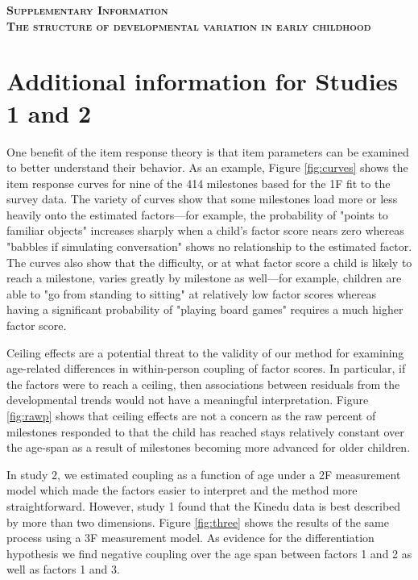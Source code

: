 \documentclass[11pt]{article}
\begin{document}
\begin{center}
\textbf{\textsc{\LARGE Supplementary Information}}\\
\textbf{\textsc{\LARGE The structure of developmental variation in early childhood}}
\end{center}

\section{Additional information for Studies 1 and  2}

One benefit of the item response theory is that item parameters can be examined to better understand their behavior. As an example, Figure \ref{fig:curves} shows the item response curves for nine of the 414 milestones based for the 1F fit to the survey data. The variety of curves show that some milestones load more or less heavily onto the estimated factors—for example, the probability of "points to familiar objects" increases sharply when a child's factor score nears zero whereas "babbles if simulating conversation" shows no relationship to the estimated factor. The curves also show that the difficulty, or at what factor score a child is likely to reach a milestone, varies greatly by milestone as well—for example, children are able to "go from standing to sitting" at relatively low factor scores whereas having a significant probability of "playing board games" requires a much higher factor score.


Ceiling effects are a potential threat to the validity of our method for examining age-related differences in within-person coupling of factor scores. In particular, if the factors were to reach a ceiling, then associations between residuals from the developmental trends would not have a meaningful interpretation. Figure \ref{fig:rawp} shows that ceiling effects are not a concern as the raw percent of milestones responded to that the child has reached stays relatively constant over the age-span as a result of milestones becoming more advanced for older children.


In study 2, we estimated coupling as a function of age under a 2F measurement model which made the factors easier to interpret and the method more straightforward. However, study 1 found that the Kinedu data is best described by more than two dimensions. Figure \ref{fig:three} shows the results of the same process using a 3F measurement model. As evidence for the differentiation hypothesis we find negative coupling over the age span between factors 1 and 2 as well as factors 1 and 3.
\end{document}

